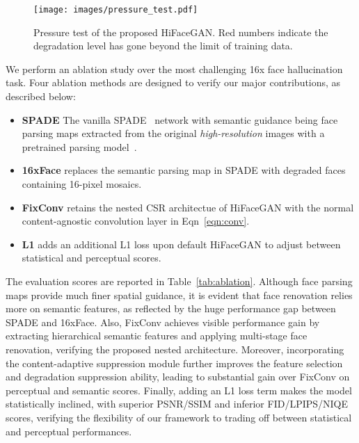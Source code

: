 \documentclass[sigconf]{acmart}
\begin{document}
\begin{figure}[!tp]
    \centering
      \texttt{[image: images/pressure\_test.pdf]}
      \caption{
      Pressure test of the proposed HiFaceGAN. Red numbers indicate the degradation level has gone beyond the limit of training data.
      }\label{fig:pressure_test}
\end{figure}

We perform an ablation study over the most challenging 16x face hallucination task. Four ablation methods are designed to verify our major contributions, as described below:
\begin{itemize}
  \item \textbf{SPADE} The vanilla SPADE~\cite{spade} network with semantic guidance being face parsing maps extracted from the original \textit{high-resolution} images with a pretrained parsing model~\cite{MaskGAN}.
  \item \textbf{16xFace} replaces the semantic parsing map in SPADE with degraded faces containing 16-pixel mosaics.
  \item \textbf{FixConv} retains the nested CSR architectue of HiFaceGAN with the normal content-agnostic convolution layer in Eqn~\eqref{eqn:conv}.
  \item \textbf{L1} adds an additional L1 loss upon default HiFaceGAN to adjust between statistical and perceptual scores.
\end{itemize}

The evaluation scores are reported in Table~\ref{tab:ablation}. Although face parsing maps provide much finer spatial guidance, it is evident that face renovation relies more on semantic features, as reflected by the huge performance gap between SPADE and 16xFace. Also, FixConv achieves visible performance gain by extracting hierarchical semantic features and applying multi-stage face renovation, verifying the proposed nested architecture. Moreover, incorporating the content-adaptive suppression module further improves the feature selection and degradation suppression ability, leading to substantial gain over FixConv on perceptual and semantic scores. Finally, adding an L1 loss term makes the model statistically inclined, with superior PSNR/SSIM and inferior FID/LPIPS/NIQE scores, verifying the flexibility of our framework to trading off between statistical and perceptual performances.
\end{document}
